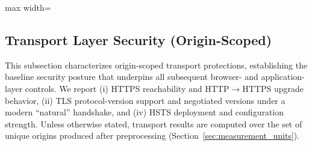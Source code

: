 \documentclass[a4paper,fleqn]{cas-sc}
\begin{document}
\begin{table}[t]
  \caption{Redirect resolution summary (inputs mapped to measured endpoints).}
  \label{tab:redirect_summary}
  \centering
  \scriptsize
  \setlength{\tabcolsep}{3pt}
  \renewcommand{\arraystretch}{1.15}
  \begin{adjustbox}{max width=\columnwidth}
  \end{adjustbox}
  \end{table}

\subsection{Transport Layer Security (Origin-Scoped)}\label{sec:transport_results}
  This subsection characterizes origin-scoped transport protections, establishing the baseline security posture that underpins all subsequent browser- and application-layer controls. 
  We report 
  (i) HTTPS reachability and HTTP$\rightarrow$HTTPS upgrade behavior, 
  (ii) TLS protocol-version support and negotiated versions under a modern ``natural'' handshake, and 
  (iv) HSTS deployment and configuration strength. 
  Unless otherwise stated, transport results are computed over the set of unique origins produced after preprocessing (Section~\ref{sec:measurement_units}). 
\end{document}
